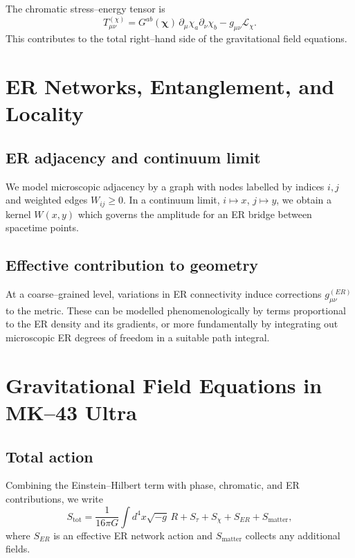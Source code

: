 The chromatic stress--energy tensor is
\begin{equation}
  T^{(\chi)}_{\mu\nu}
  =
  G^{ab}(\bm{\chi})\, \partial_\mu\chi_a \partial_\nu\chi_b
  - g_{\mu\nu}\mathcal{L}_\chi.
\end{equation}
This contributes to the total right--hand side of the gravitational field equations.

\chapter{ER Networks, Entanglement, and Locality}

\section{ER adjacency and continuum limit}

We model microscopic adjacency by a graph with nodes labelled by indices $i,j$ and weighted edges $W_{ij}\ge 0$.
In a continuum limit, $i\mapsto x$, $j\mapsto y$, we obtain a kernel $W(x,y)$ which governs the amplitude for an ER bridge between spacetime points.

\section{Effective contribution to geometry}

At a coarse--grained level, variations in ER connectivity induce corrections $g^{(ER)}_{\mu\nu}$ to the metric.
These can be modelled phenomenologically by terms proportional to the ER density and its gradients, or more fundamentally by integrating out microscopic ER degrees of freedom in a suitable path integral.

\chapter{Gravitational Field Equations in MK--43 Ultra}

\section{Total action}

Combining the Einstein--Hilbert term with phase, chromatic, and ER contributions, we write
\begin{equation}
  S_{\mathrm{tot}} =
  \frac{1}{16\pi G}\int d^4x \sqrt{-g}\, R
  + S_\tau + S_\chi + S_{ER} + S_{\mathrm{matter}},
\end{equation}
where $S_{ER}$ is an effective ER network action and $S_{\mathrm{matter}}$ collects any additional fields.

